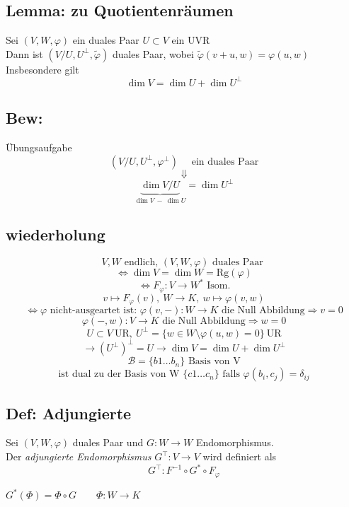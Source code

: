 \documentclass[titlepage,12pt,a4paper,ngerman]{report}
\newcommand{\tx}[1]{\textrm{#1}}
\newcommand{\ub}[1]{\underbrace{#1}}
\begin{document}
\subsection{Lemma: zu Quotientenräumen}
Sei $ (V,W,\varphi) $ ein duales Paar $ U\subset V $ ein UVR\\
Dann ist $ (V/U, U^\perp, \tilde{\varphi}) $ duales Paar, wobei $ \tilde{\varphi}(v+u,w) = \varphi(u,w) $\\
Insbesondere gilt $$ \dim V = \dim U + \dim U^\perp $$
\subsection*{Bew:}
Übungsaufgabe
$$ (V/U,U^\perp,\varphi^\perp) \quad \tx{ ein duales Paar}$$
$$ \Downarrow$$
$$ \ub{\dim V/U}_{\dim V \  -\  \dim U} = \dim U^\perp $$


\subsection{wiederholung}
$$V, W \tx{ endlich, } (V,W,\varphi) \tx{ duales Paar }$$ 
$$\Leftrightarrow \dim V = \dim W = \tx{Rg}(\varphi)$$  
$$\Leftrightarrow F_\varphi: V \to W^* \tx{ Isom.}$$
$$v \mapsto F_\varphi(v),\ W \to K,\ w \mapsto \varphi(v,w)$$
$$\Leftrightarrow \varphi \tx{ nicht-ausgeartet ist: } \varphi(v,-): W \to K \tx{ die Null Abbildung} \Rightarrow v = 0$$
$$\varphi(-,w): V \to K  \tx{ die Null Abbildung} \Rightarrow w = 0$$
$$U \subset V\ \tx{UR},\ U^\perp = \{w \in W \setminus \varphi(u,w) = 0\}\ \tx{UR}$$
$$\rightarrow(U^\perp)^\perp = U \rightarrow \dim V = \dim U + \dim U^\perp$$
$$\mathcal B = \{b1 \dots b_n\}\tx{ Basis von V}$$
$$\tx{ist dual zu der Basis von W }\{c1 \dots c_n\} \tx{ falls } \varphi(b_i,c_j) = \delta_{ij}$$
\subsection{Def: Adjungierte}
Sei $(V,W,\varphi)$ duales Paar und $G:W \to W$ Endomorphismus.\\
Der \emph{adjungierte Endomorphismus} $G^\top: V \to V$ wird definiert als $$G^\top:F^{-1} \circ G^* \circ F_\varphi$$
\begin{center}
\end{center}
$ G^*(\Phi) = \Phi \circ G \qquad \Phi: W \to K $%
\end{document}
